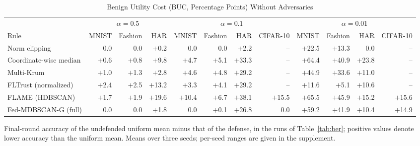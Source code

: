 \begin{table}[!tp]
\centering\footnotesize
\setlength{\tabcolsep}{4pt}
\caption{Benign Utility Cost (BUC, Percentage Points) Without Adversaries}\label{tab:buc}
\begin{adjustbox}{max width=\textwidth}
\begin{tabular}{lrrrrrrrrrrr}
\toprule
& \multicolumn{3}{c}{$\alpha=0.5$} & \multicolumn{4}{c}{$\alpha=0.1$} & \multicolumn{4}{c}{$\alpha=0.01$} \\
\cmidrule(lr){2-4}\cmidrule(lr){5-8}\cmidrule(lr){9-12}
Rule & MNIST & Fashion & HAR & MNIST & Fashion & HAR & CIFAR-10 & MNIST & Fashion & HAR & CIFAR-10 \\
\midrule
Norm clipping & 0.0 & 0.0 & $+$0.2 & 0.0 & 0.0 & $+$2.2 & -- & $+$22.5 & $+$13.3 & 0.0 & -- \\
Coordinate-wise median & $+$0.6 & $+$0.8 & $+$9.8 & $+$4.7 & $+$5.1 & $+$33.3 & -- & $+$64.4 & $+$40.9 & $+$23.8 & -- \\
Multi-Krum & $+$1.0 & $+$1.3 & $+$2.8 & $+$4.6 & $+$4.8 & $+$29.2 & -- & $+$44.9 & $+$33.6 & $+$11.0 & -- \\
FLTrust (normalized) & $+$2.4 & $+$2.5 & $+$13.2 & $+$3.3 & $+$4.1 & $+$29.2 & -- & $+$11.6 & $+$5.1 & $+$10.6 & -- \\
FLAME (HDBSCAN) & $+$1.7 & $+$1.9 & $+$19.6 & $+$10.4 & $+$6.7 & $+$38.1 & $+$15.5 & $+$65.5 & $+$45.9 & $+$15.2 & $+$15.6 \\
Fed-MDBSCAN-G (full) & 0.0 & 0.0 & $+$1.8 & 0.0 & $+$0.1 & $+$26.8 & 0.0 & $+$59.2 & $+$41.9 & $+$10.4 & $+$14.9 \\
\bottomrule
\end{tabular}
\end{adjustbox}

\par\vspace{3pt}\parbox{\linewidth}{\footnotesize Final-round accuracy of the undefended uniform mean minus that of the defense, in the runs of Table~\ref{tab:ber}; positive values denote lower accuracy than the uniform mean. Means over three seeds; per-seed ranges are given in the supplement.}
\end{table}
